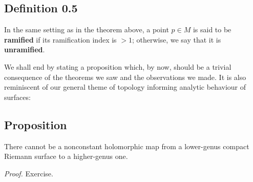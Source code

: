 \documentclass[11pt,a4paper]{article}
\begin{document}
\subsection*{Definition 0.5}
    In the same setting as in the theorem above, a point $p \in M$ is said to be \textbf{ramified} if its ramification index is $> 1$; otherwise, we say that it is \textbf{unramified}.


We shall end by stating a proposition which, by now, should be a trivial consequence of the theorems we saw and the observations we made. It is also reminiscent of our general theme of topology informing analytic behaviour of surfaces:

\subsection*{Proposition} There cannot be a nonconstant holomorphic map from a lower-genus compact Riemann surface to a higher-genus one.

\textit{Proof.}
Exercise.

\end{document}
